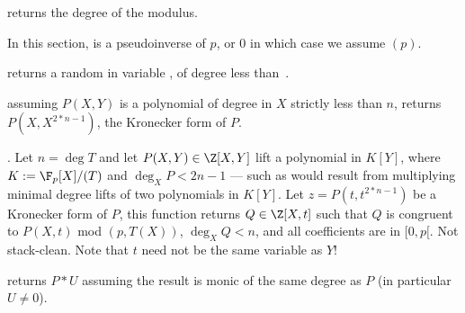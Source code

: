  returns the degree of the modulus.


In this section,  is a pseudoinverse of $p$, or $0$ in which case we
assume $(p)$.

 returns a random
 in variable , of degree less than~.

 assuming $P(X,Y)$ is a polynomial
of degree in $X$ strictly less than $n$, returns $P(X,X^{2*n-1})$, the
Kronecker form of $P$.

. Let $n = \deg T$ and let
$P(X,Y)\in \Z[X,Y]$ lift a polynomial in $K[Y]$, where $K := \F_p[X]/(T)$ and
$\deg_X P < 2n-1$ --- such as would result from multiplying minimal degree
lifts of two polynomials in $K[Y]$. Let $z = P(t,t^{2*n-1})$ be a Kronecker
form of $P$, this function returns $Q\in \Z[X,t]$ such that $Q$ is congruent to
$P(X,t)$ mod $(p, T(X))$, $\deg_X Q < n$, and all coefficients are in $[0,p[$.
Not stack-clean. Note that $t$ need not be the same variable as $Y$!










returns $P*U$ assuming the result is monic of the same degree as $P$ (in
particular $U\neq 0$).




